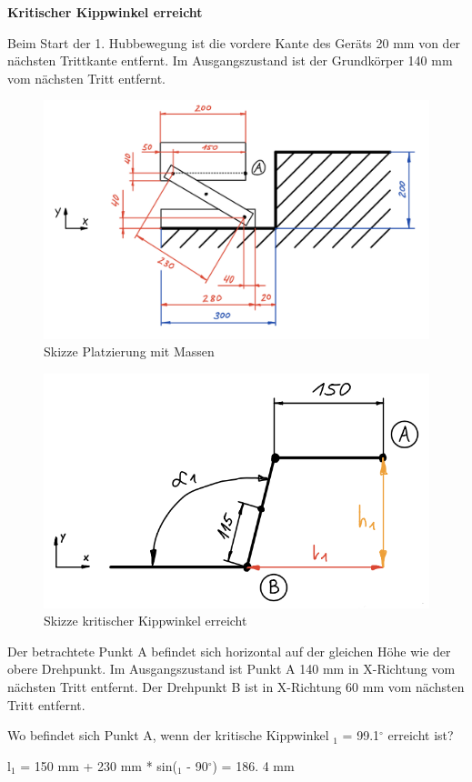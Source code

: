 \textbf{Kritischer Kippwinkel erreicht}

Beim Start der 1. Hubbewegung ist die vordere Kante des Geräts 20 mm von der nächsten Trittkante entfernt. Im Ausgangszustand ist der Grundkörper 140 mm vom nächsten Tritt entfernt.\\

\begin{figure}[H]
  \includegraphics[width=0.8
  \textwidth]{img/Treppensteigen/Skizze Platzierung}
  \centering
  \caption{Skizze Platzierung mit Massen}
\end{figure}

\begin{figure}[H]
  \includegraphics[width=0.6
  \textwidth]{img/Treppensteigen/Analyse 1.png}
  \centering
  \caption{Skizze kritischer Kippwinkel erreicht}
\end{figure}

Der betrachtete Punkt A befindet sich horizontal auf der gleichen Höhe wie der obere Drehpunkt. Im Ausgangszustand ist Punkt A 140 mm in X-Richtung vom nächsten Tritt entfernt. Der Drehpunkt B ist in X-Richtung 60 mm vom nächsten Tritt entfernt.

Wo befindet sich Punkt A, wenn der kritische Kippwinkel \alpha$_{1}$ = 99.1$^\circ$ erreicht ist?

l$_{1}$ = 150 mm + 230 mm * sin(\alpha$_{1}$ - 90$^\circ$) = 186. 4 mm

